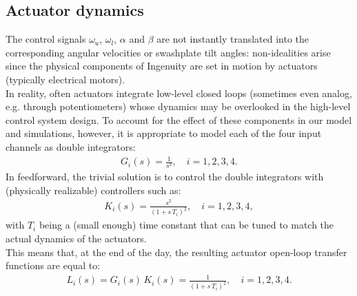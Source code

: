 \subsection{Actuator dynamics}
The control signals $\omega_u$, $\omega_l$, $\alpha$ and $\beta$ are not instantly translated into the corresponding angular velocities or swashplate tilt angles: non-idealities arise since the physical components of Ingenuity are set in motion by actuators (typically electrical motors). \\
In reality, often actuators integrate low-level closed loops (sometimes even analog, e.g. through potentiometers) whose dynamics may be overlooked in the high-level control system design.
To account for the effect of these components in our model and simulations, however, it is appropriate to model each of the four input channels as double integrators:
\begin{align*}
    G_i(s) = \frac{1}{s^2}, \quad i = 1, 2, 3, 4.
\end{align*}
In feedforward, the trivial solution is to control the double integrators with (physically realizable) controllers such as:
\begin{align*}
    K_i(s) = \frac{s^2}{(1 + s \, T_i)^2}, \quad i = 1, 2, 3, 4,
\end{align*}
with $T_i$ being a (small enough) time constant that can be tuned to match the actual dynamics of the actuators. \\
This means that, at the end of the day, the resulting actuator open-loop transfer functions are equal to:
\begin{align*}
    L_i(s) = G_i(s) \, K_i(s) = \frac{1}{(1 + s \, T_i)^2}, \quad i = 1, 2, 3, 4.
\end{align*}